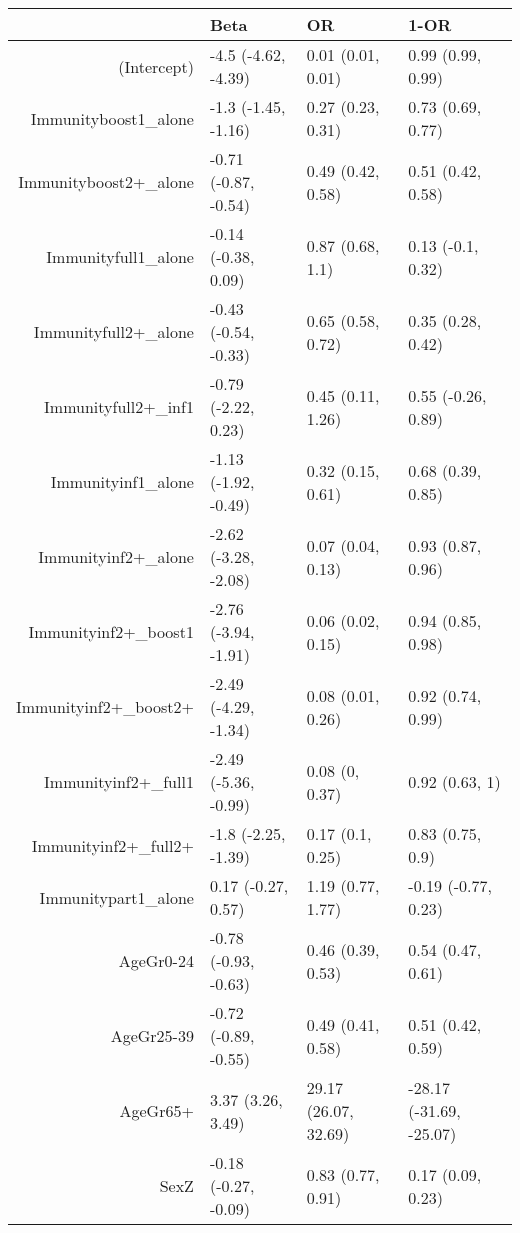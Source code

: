 \begin{table}[ht]
\centering
\begin{tabular}{rlll}
  \hline
 & Beta & OR & 1-OR \\ 
  \hline
(Intercept) & -4.5 (-4.62, -4.39) & 0.01 (0.01, 0.01) & 0.99 (0.99, 0.99) \\ 
  Immunityboost1\_alone & -1.3 (-1.45, -1.16) & 0.27 (0.23, 0.31) & 0.73 (0.69, 0.77) \\ 
  Immunityboost2+\_alone & -0.71 (-0.87, -0.54) & 0.49 (0.42, 0.58) & 0.51 (0.42, 0.58) \\ 
  Immunityfull1\_alone & -0.14 (-0.38, 0.09) & 0.87 (0.68, 1.1) & 0.13 (-0.1, 0.32) \\ 
  Immunityfull2+\_alone & -0.43 (-0.54, -0.33) & 0.65 (0.58, 0.72) & 0.35 (0.28, 0.42) \\ 
  Immunityfull2+\_inf1 & -0.79 (-2.22, 0.23) & 0.45 (0.11, 1.26) & 0.55 (-0.26, 0.89) \\ 
  Immunityinf1\_alone & -1.13 (-1.92, -0.49) & 0.32 (0.15, 0.61) & 0.68 (0.39, 0.85) \\ 
  Immunityinf2+\_alone & -2.62 (-3.28, -2.08) & 0.07 (0.04, 0.13) & 0.93 (0.87, 0.96) \\ 
  Immunityinf2+\_boost1 & -2.76 (-3.94, -1.91) & 0.06 (0.02, 0.15) & 0.94 (0.85, 0.98) \\ 
  Immunityinf2+\_boost2+ & -2.49 (-4.29, -1.34) & 0.08 (0.01, 0.26) & 0.92 (0.74, 0.99) \\ 
  Immunityinf2+\_full1 & -2.49 (-5.36, -0.99) & 0.08 (0, 0.37) & 0.92 (0.63, 1) \\ 
  Immunityinf2+\_full2+ & -1.8 (-2.25, -1.39) & 0.17 (0.1, 0.25) & 0.83 (0.75, 0.9) \\ 
  Immunitypart1\_alone & 0.17 (-0.27, 0.57) & 1.19 (0.77, 1.77) & -0.19 (-0.77, 0.23) \\ 
  AgeGr0-24 & -0.78 (-0.93, -0.63) & 0.46 (0.39, 0.53) & 0.54 (0.47, 0.61) \\ 
  AgeGr25-39 & -0.72 (-0.89, -0.55) & 0.49 (0.41, 0.58) & 0.51 (0.42, 0.59) \\ 
  AgeGr65+ & 3.37 (3.26, 3.49) & 29.17 (26.07, 32.69) & -28.17 (-31.69, -25.07) \\ 
  SexZ & -0.18 (-0.27, -0.09) & 0.83 (0.77, 0.91) & 0.17 (0.09, 0.23) \\ 
   \hline
\end{tabular}
\end{table}
